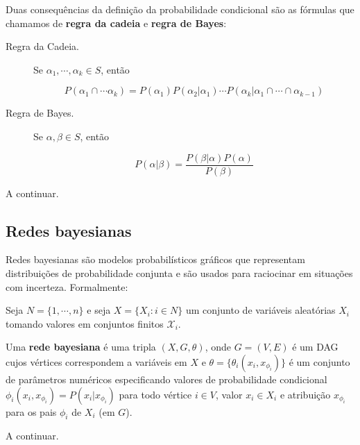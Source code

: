 Duas consequências da definição da probabilidade condicional são as fórmulas que chamamos de \textbf{regra da cadeia} e \textbf{regra de Bayes}:

\begin{description}
  \item[Regra da Cadeia.] Se $\alpha_1, \cdots, \alpha_k \in S$, então

    $$P(\alpha_1 \cap \cdots \alpha_k) = P(\alpha_1) P(\alpha_2 | \alpha_1) \cdots P(\alpha_k | \alpha_1 \cap \cdots \cap \alpha_{k-1})$$

  \item[Regra de Bayes.] Se $\alpha, \beta \in S$, então

    $$P(\alpha | \beta) = \frac{P(\beta | \alpha) P(\alpha)}{P(\beta)}$$
\end{description}

\vspace{2em}

A continuar.

\subsection{Redes bayesianas}

Redes bayesianas são modelos probabilísticos gráficos que representam distribuições de probabilidade conjunta e são usados para raciocinar em situações com incerteza. Formalmente:

\begin{definition}
  \cite{maua}
  Seja $N = \{ 1, \cdots, n \}$ e seja $X = \{X_i : i \in N\}$ um conjunto de variáveis aleatórias $X_i$ tomando valores em conjuntos finitos $\mathcal{X}_i$.

  Uma \textbf{rede bayesiana} é uma tripla $(X, G, \theta)$, onde $G = (V, E)$ é um DAG cujos vértices correspondem a variáveis em $X$ e $\theta = \{\theta_i(x_i, x_{\phi_i})\}$ é um conjunto de parâmetros numéricos especificando valores de probabilidade condicional $\phi_i(x_i, x_{\phi_i}) = P(x_i | x_{\phi_i})$ para todo vértice $i \in V$, valor $x_i \in X_i$ e atribuição $x_{\phi_i}$ para os pais $\phi_i$ de $X_i$ (em $G$).
\end{definition}

\vspace{2em}

A continuar.
